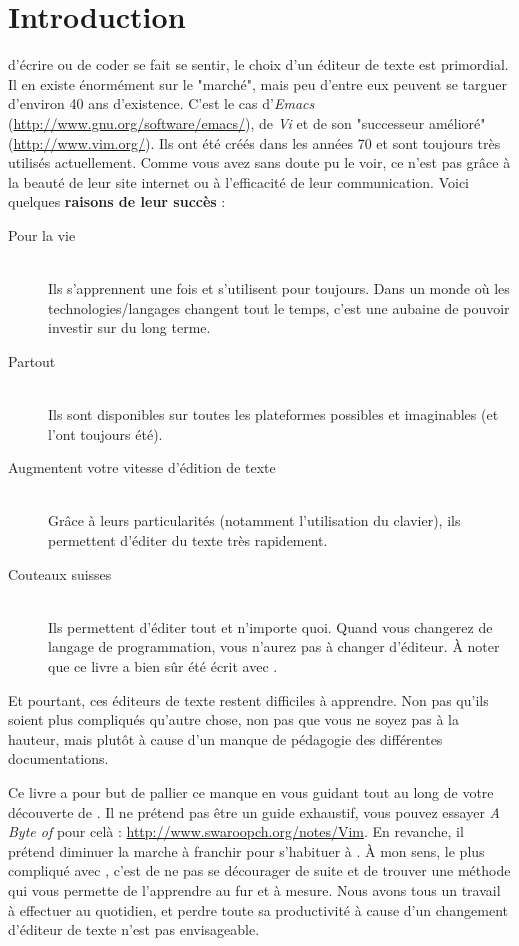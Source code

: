 \chapter*{Introduction}

 d'écrire ou de coder se fait se sentir, le choix d'un éditeur de texte est primordial. Il en existe énormément sur le "marché", mais peu d'entre eux peuvent se targuer d'environ 40 ans d'existence. C'est le cas d'\emph{Emacs} (\url{http://www.gnu.org/software/emacs/}), de \emph{Vi} et de son "successeur amélioré" \vim (\url{http://www.vim.org/}). Ils ont été créés dans les années 70 et sont toujours très utilisés actuellement. Comme vous avez sans doute pu le voir, ce n'est pas grâce à la beauté de leur site internet ou à l'efficacité de leur communication. Voici quelques \textbf{raisons de leur succès} :

\begin{description}
    \item[Pour la vie] \hfill \\ Ils s'apprennent une fois et s'utilisent pour toujours. Dans un monde où les technologies/langages changent tout le temps, c'est une aubaine de pouvoir investir sur du long terme.
    \item[Partout] \hfill \\ Ils sont disponibles sur toutes les plateformes possibles et imaginables (et l'ont toujours été).
    \item[Augmentent votre vitesse d'édition de texte] \hfill \\ Grâce à leurs particularités (notamment l'utilisation du clavier), ils permettent d'éditer du texte très rapidement.
    \item[Couteaux suisses] \hfill \\ Ils permettent d'éditer tout et n'importe quoi. Quand vous changerez de langage de programmation, vous n'aurez pas à changer d'éditeur. À noter que ce livre a bien sûr été écrit avec \vim.
\end{description}

Et pourtant, ces éditeurs de texte restent difficiles à apprendre. Non pas qu'ils soient plus compliqués qu'autre chose, non pas que vous ne soyez pas à la hauteur, mais plutôt à cause d'un manque de pédagogie des différentes documentations.

Ce livre a pour but de pallier ce manque en vous guidant tout au long de votre découverte de \vim{}. Il ne prétend pas être un guide exhaustif, vous pouvez essayer \emph{A Byte of \vim} pour celà : \url{http://www.swaroopch.org/notes/Vim}. En revanche, il prétend diminuer la marche à franchir pour s'habituer à \vim. À mon sens, le plus compliqué avec \vim, c'est de ne pas se décourager de suite et de trouver une méthode qui vous permette de l'apprendre au fur et à mesure. Nous avons tous un travail à effectuer au quotidien, et perdre toute sa productivité à cause d'un changement d'éditeur de texte n'est pas envisageable.

